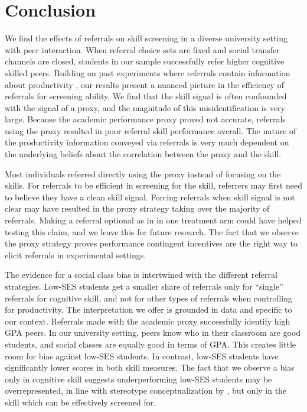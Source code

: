 \documentclass[11pt,a4paper,oneside]{article}
\begin{document}
  \section{Conclusion}
  We find the effects of referrals on skill screening in a diverse university setting with peer interaction. When referral choice sets are fixed and social transfer channels are closed, students in our sample successfully refer higher cognitive skilled peers. Building on past experiments where referrals contain information about productivity \citep{beaman_who_2012,beaman_job_2018,pallais_why_2016}, our results present a nuanced picture in the efficiency of referrals for screening ability. We find that the skill signal is often confounded with the signal of a proxy, and the magnitude of this misidentification is very large. Because the academic performance proxy proved not accurate, referrals using the proxy resulted in poor referral skill performance overall. The nature of the productivity information conveyed via referrals is very much dependent on the underlying beliefs about the correlation between the proxy and the skill.

  Most individuals referred directly using the proxy instead of focusing on the skills. For referrals to be efficient in screening for the skill, referrers may first need to believe they have a clean skill signal. Forcing referrals when skill signal is not clear may have resulted in the proxy strategy taking over the majority of referrals. Making a referral optional as in \citet{beaman_who_2012,beaman_job_2018} in one treatment arm could have helped testing this claim, and we leave this for future research. The fact that we observe the proxy strategy proves performance contingent incentives are the right way to elicit referrals in experimental settings.
  
  The evidence for a social class bias is intertwined with the different referral strategies. Low-SES students get a smaller share of referrals only for ``single'' referrals for cognitive skill, and not for other types of referrals when controlling for productivity. The interpretation we offer is grounded in data and specific to our context. Referrals made with the academic proxy successfully identify high GPA peers. In our university setting, peers know who in their classroom are good students, and social classes are equally good in terms of GPA. This creates little room for bias against low-SES students. In contrast, low-SES students have significantly lower scores in both skill measures. The fact that we observe a bias only in cognitive skill suggests underperforming low-SES students may be overrepresented, in line with stereotype conceptualization by \citet{bordalo2016stereotypes}, but only in the skill which can be effectively screened for.
  
\end{document}
